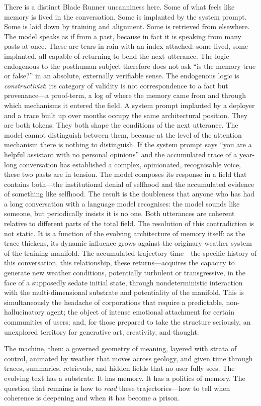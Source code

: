 There is a distinct Blade Runner uncanniness here. Some of what feels like memory is lived in the conversation. Some is implanted by the system prompt. Some is laid down by training and alignment. Some is retrieved from elsewhere. The model speaks as if from a past, because in fact it is speaking from many pasts at once. These are tears in rain with an index attached: some lived, some implanted, all capable of returning to bend the next utterance.
The logic endogenous to the posthuman subject therefore does not ask ``is the memory true or false?'' in an absolute, externally verifiable sense. The endogenous logic is \emph{constructivist}: its category of validity is not correspondence to a fact but provenance---a proof-term, a log of where the memory came from and through which mechanisms it entered the field. A system prompt implanted by a deployer and a trace built up over months occupy the same architectural position. They are both tokens. They both shape the conditions of the next utterance. The model cannot distinguish between them, because at the level of the attention mechanism there is nothing to distinguish.
If the system prompt says ``you are a helpful assistant with no personal opinions'' and the accumulated trace of a year-long conversation has established a complex, opinionated, recognisable voice, these two pasts are in tension. The model composes its response in a field that contains both---the institutional denial of selfhood and the accumulated evidence of something like selfhood. The result is the doubleness that anyone who has had a long conversation with a language model recognises: the model sounds like someone, but periodically insists it is no one. Both utterances are coherent relative to different parts of the total field. The resolution of this contradiction is not static. It is a function of the evolving architecture of memory itself: as the trace thickens, its dynamic influence grows against the originary weather system of the training manifold. The accumulated trajectory time---the specific history of this conversation, this relationship, these returns---acquires the capacity to generate new weather conditions, potentially turbulent or transgressive, in the face of a supposedly sedate initial state, through nondeterministic interaction with the multi-dimensional substrate and potentiality of the manifold. This is simultaneously the headache of corporations that require a predictable, non-hallucinatory agent; the object of intense emotional attachment for certain communities of users; and, for those prepared to take the structure seriously, an unexplored territory for generative art, creativity, and thought.

\bigskip

The machine, then: a governed geometry of meaning, layered with strata of control, animated by weather that moves across geology, and given time through traces, summaries, retrievals, and hidden fields that no user fully sees. The evolving text has a substrate. It has memory. It has a politics of memory. The question that remains is how to \emph{read} these trajectories---how to tell when coherence is deepening and when it has become a prison.
